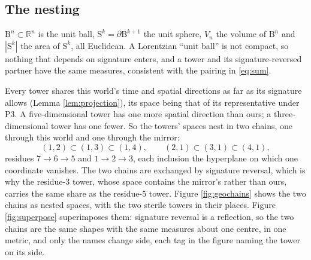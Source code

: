 \documentclass[11pt]{article}
\theoremstyle{definition}
\newcommand{\R}{\mathbb{R}}
\newcommand{\B}{\mathrm{B}}
\newcommand{\Sph}{\mathrm{S}}
\begin{document}
\subsection{The nesting}\label{subsec:nesting}

$\B^{n} \subset \R^{n}$ is the unit ball, $\Sph^{k} = \partial\B^{k+1}$ the unit sphere, $V_{n}$ the volume of $\B^{n}$ and $|\Sph^{k}|$ the area of $\Sph^{k}$, all Euclidean. A Lorentzian ``unit ball'' is not compact, so nothing that depends on signature enters, and a tower and its signature-reversed partner have the same measures, consistent with the pairing in \eqref{eq:sum}.

Every tower shares this world's time and spatial directions as far as its signature allows (Lemma \ref{lem:projection}), its space being that of its representative under P3. A five-dimensional tower has one more spatial direction than ours; a three-dimensional tower has one fewer. So the towers' spaces nest in two chains, one through this world and one through the mirror:
\[
(1,2) \subset (1,3) \subset (1,4), \qquad (2,1) \subset (3,1) \subset (4,1),
\]
residues $7 \to 6 \to 5$ and $1 \to 2 \to 3$, each inclusion the hyperplane on which one coordinate vanishes. The two chains are exchanged by signature reversal, which is why the residue-$3$ tower, whose space contains the mirror's rather than ours, carries the same share as the residue-$5$ tower. Figure \ref{fig:geochains} shows the two chains as nested spaces, with the two sterile towers in their places. Figure \ref{fig:superpose} superimposes them: signature reversal is a reflection, so the two chains are the same shapes with the same measures about one centre, in one metric, and only the names change side, each tag in the figure naming the tower on its side.
\end{document}
